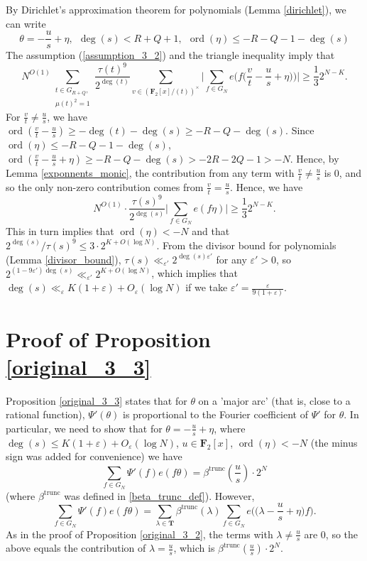 \documentclass[11pt, reqno]{amsart}
\numberwithin{equation}{section}
\newcommand{\zff}{\mathbf{F}_2[x]}
\newcommand{\zffmi}[1]{(\zff/(#1))^{\times}}
\newcommand{\zffmodinvt}{\zffmi{t}}
\newcommand{\betatrunc}{\beta^{\trunc}}
\newcommand\eps{\varepsilon}
\newcommand\ord{\operatorname{ord}}
\newcommand\trunc{\operatorname{trunc}}
\begin{document}
By Dirichlet's approximation theorem for polynomials (Lemma \ref{dirichlet}), we can write
\begin{equation}
    \theta=-\frac{u}{s}+\eta, \ \ \deg(s) < R+Q+1, \ \ \ord(\eta) \leqslant -R-Q-1-\deg(s)
\end{equation}
The assumption (\ref{assumption_3_2}) and the triangle inequality imply that
$$N^{O(1)}\sum_{\substack{t \in G_{R+Q},\\ \mu(t)^2=1}} \frac{\tau(t)^9}{2^{\deg( t )}} \sum_{v \in \zffmodinvt} \bigg| \sum_{f \in G_N} e \Big(f\big(\frac{v}{t}-\frac{u}{s}+\eta\big)\Big) \bigg| \geqslant \frac{1}{3}2^{N-K}.$$
For $\frac{v}{t} \neq \frac{u}{s}$, we have $\ord(\frac{v}{t}-\frac{u}{s})\geqslant -\deg(t)-\deg(s)\geqslant-R-Q-\deg(s)$. Since $\ord(\eta)\leqslant -R-Q-1-\deg(s)$, $\ord(\frac{v}{t}-\frac{u}{s}+\eta) \geqslant -R-Q-\deg(s)>-2R-2Q-1>-N$. Hence, by Lemma \ref{exponnents_monic}, the contribution from any term with $\frac{v}{t} \neq \frac{u}{s}$ is $0$, and so the only non-zero contribution comes from $\frac{v}{t}=\frac{u}{s}$. Hence, we have $$N^{O(1)} \cdot\frac{\tau(s)^9 }{2^{\deg( s )}} \bigg| \sum_{f \in G_N} e(f\eta) \bigg| \geqslant \frac{1}{3}2^{N-K}.$$
This in turn implies that $\ord(\eta)<-N$ and that
$2^{\deg(s)}/\tau(s)^9 \leqslant 3 \cdot 2^{K+O(\log N)}$. From the divisor bound for polynomials (Lemma \ref{divisor_bound}), $\tau(s) \ll_{\eps'} 2^{\deg(s)\eps'}$ for any $\eps' > 0$, so $2^{(1-9\eps')\deg(s)}\ll_{\eps'} 2^{K+O(\log N)}$, which implies that $\deg(s) \ll_{\eps} K(1+\eps)+O_{\eps}(\log N)$ if we take $\eps'=\frac{\eps}{9(1+\eps)}$.

\section{Proof of Proposition \ref{original_3_3}}
\label{section_3_3}
Proposition \ref{original_3_3} states that for $\theta$ on a 'major arc' (that is, close to a rational function), $\Psi'(\theta)$ is proportional to the Fourier coefficient of $\Psi'$ for $\theta$. In particular, we need to show that for $\theta=-\frac{u}{s}+\eta$, where $\deg(s) \leqslant K(1+\eps)+O_{\eps}(\log N)$, $u \in \zff$, $\ord(\eta) < -N$ (the minus sign was added for convenience) we have
$$\sum_{f \in G_N} \Psi'(f) e(f\theta) = \beta^{\trunc}(\frac{u}{s})\cdot 2^N$$
(where $\beta^{\trunc}$ was defined in \ref{beta_trunc_def}).
However,
$$\sum_{f \in G_N} \Psi'(f)e(f\theta)= \sum_{\lambda \in \mathbf{T}} \betatrunc(\lambda)\sum_{f \in G_N} e\Big( \big(\lambda-\frac{u}{s}+\eta\big)f\Big).$$
As in the proof of Proposition \ref{original_3_2}, the terms with $\lambda\neq \frac{u}{s}$ are $0$, so the above equals the contribution of $\lambda=\frac{u}{s}$, which is $\betatrunc(\frac{u}{s}) \cdot 2^N$.
\end{document}
